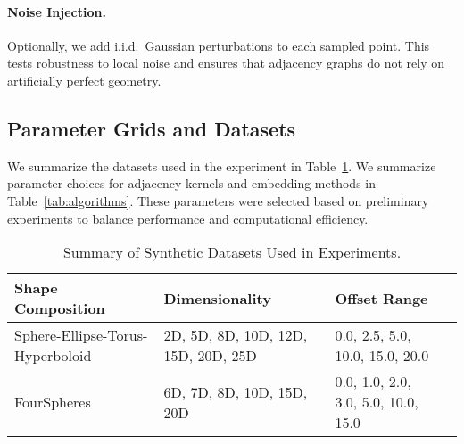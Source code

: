 \documentclass{article}
\theoremstyle{plain}
\theoremstyle{definition}
\theoremstyle{remark}
\begin{document}
\paragraph{Noise Injection.}
Optionally, we add i.i.d.\ Gaussian perturbations to each sampled point. This tests robustness to local noise and ensures that adjacency graphs do not rely on artificially perfect geometry.

\subsection{Parameter Grids and Datasets}
\label{app:params}

We summarize the datasets used in the experiment in Table~\ref{tab:datasets}. We summarize parameter choices for adjacency kernels and embedding methods in Table~\ref{tab:algorithms}. These parameters were selected based on preliminary experiments to balance performance and computational efficiency.

\begin{table}[t]
\centering
\caption{Summary of Synthetic Datasets Used in Experiments.}
\label{tab:datasets}
\begin{tabular}{lllc}
\toprule
\textbf{Shape Composition} & \textbf{Dimensionality} & \textbf{Offset Range} \\
\midrule
Sphere-Ellipse-Torus-Hyperboloid & 2D, 5D, 8D, 10D, 12D, 15D, 20D, 25D & 0.0, 2.5, 5.0, 10.0, 15.0, 20.0 \\
FourSpheres & 6D, 7D, 8D, 10D, 15D, 20D & 0.0, 1.0, 2.0, 3.0, 5.0, 10.0, 15.0 \\
\bottomrule
\end{tabular}
\end{table}
\end{document}
